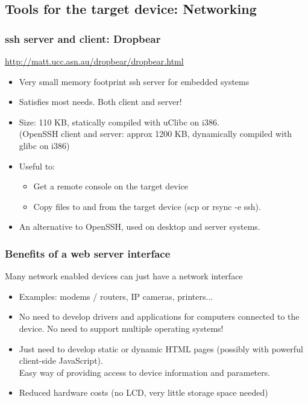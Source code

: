 \subsection[Networking tools]{Tools for the target device: Networking}

\begin{frame}
  \frametitle{ssh server and client: Dropbear}
  \url{http://matt.ucc.asn.au/dropbear/dropbear.html}
  \begin{itemize}
  \item Very small memory footprint ssh server for embedded systems
  \item Satisfies most needs. Both client and server!
  \item Size: 110 KB, statically compiled with uClibc on i386.\\
    (OpenSSH client and server: approx 1200 KB, dynamically compiled
    with glibc on i386)
  \item Useful to:
    \begin{itemize}
    \item Get a remote console on the target device
    \item Copy files to and from the target device (scp or rsync -e
      ssh).
    \end{itemize}
  \item An alternative to OpenSSH, used on desktop and server systems.
  \end{itemize}
\end{frame}

\begin{frame}
  \frametitle{Benefits of a web server interface}

  Many network enabled devices can just have a network interface

  \begin{itemize}
  \item Examples: modems / routers, IP cameras, printers...
  \item No need to develop drivers and applications for computers
    connected to the device. No need to support multiple operating
    systems!
  \item Just need to develop static or dynamic HTML pages (possibly
    with powerful client-side JavaScript).\\
    Easy way of providing access to device information and parameters.
  \item Reduced hardware costs (no LCD, very little storage space
    needed)
  \end{itemize}
\end{frame}

